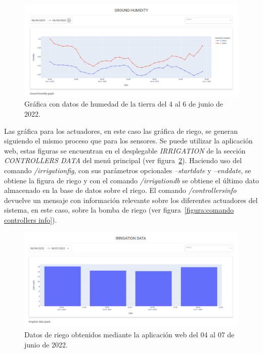 \documentclass[a4paper, 12pt, oneside]{book}
\begin{document}
\begin{figure}[H]
	\centering
    \includegraphics[width=12cm, keepaspectratio]{img/ground_humidity}
    \caption{Gráfica con datos de humedad de la tierra del 4 al 6 de junio de 2022.}
    \label{figura:humedad tierra}
\end{figure}

Las gráfica para los actuadores, en este caso las gráfica de riego, se generan siguiendo el mismo proceso que para los sensores. Se puede utilizar la aplicación web, estas figuras se encuentran en el desplegable \textit{IRRIGATION} de la sección \textit{CONTROLLERS DATA} del menú principal (ver figura~\ref{figura:grafica_irrigation_data_04_07_junio}).
Haciendo uso del comando \textit{/irrigationfig}, con sus parámetros opcionales \textit{--startdate} y \textit{--enddate}, se obtiene la figura de riego y con el comando \textit{/irrigationdb} se obtiene el último dato almacenado en la base de datos sobre el riego. El comando \textit{/controllersinfo} devuelve un mensaje con información relevante sobre los diferentes actuadores del sistema, en este caso, sobre la bomba de riego (ver figura~\ref{figura:comando controllers info}).

\begin{figure}[H]
	\centering
    \includegraphics[width=12cm, keepaspectratio]{img/grafica_irrigation_data_04_07_junio}
    \caption{Datos de riego obtenidos mediante la aplicación web del 04 al 07 de junio de 2022.}
    \label{figura:grafica_irrigation_data_04_07_junio}
\end{figure}
\end{document}
